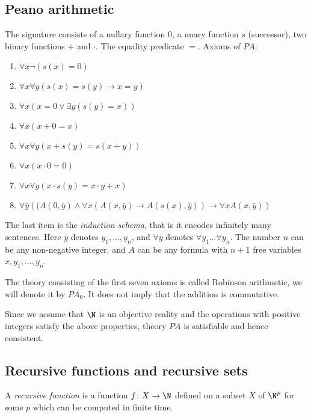 \begin{page}

\subsection{Peano arithmetic}
The signature consists of a nullary function $0$, a unary function $s$ (successor), two binary functions $+$ and $\cdot$.
The equality predicate $=$.
Axioms of $PA$:
\begin{enumerate}
\item
$\forall x \neg(s(x) = 0)$
\item
$\forall x \forall y (s(x)=s(y) \to x=y)$
\item
$\forall x (x = 0 \vee \exists y (s(y)=x))$
\item
$\forall x (x+0=x)$
\item
$\forall x \forall y (x+s(y) = s(x+y))$
\item
$\forall x (x \cdot 0 = 0)$
\item
$\forall x \forall y (x \cdot s(y) = x \cdot y + x)$
\item
$\forall \bar y \left((A(0, \bar y) \wedge \forall x (A(x, \bar y) \to A(s(x), \bar y)) \to \forall x A(x, \bar y)\right)$
\end{enumerate}
The last item is the \emph{induction schema}, that is it encodes infinitely many sentences.
Here $\bar y$ denotes $y_1, \ldots, y_n$, and $\forall \bar y$ denotes $\forall y_1 \ldots \forall y_n$.
The number $n$ can be any non-negative integer, and $A$ can be any formula with $n+1$ free variables $x, y_1, \ldots, y_n$.


The theory consisting of the first seven axioms is called Robinson arithmetic, we will denote it by $PA_0$.
It does not imply that the addition is commutative.

Since we assume that $\N$ is an objective reality and the operations with positive integers satisfy the above properties,
theory $PA$ is satisfiable and hence consistent.





\subsection{Recursive functions and recursive sets}

\end{page}

\begin{page}

\begin{dfn}
A \emph{recursive function} is a function $f \colon X \to \N$ defined on a subset $X$ of $\N^p$ for some $p$
which can be computed in finite time.
\end{dfn}

\end{page}

